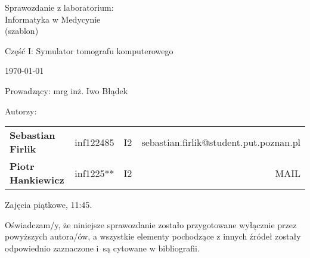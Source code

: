 \thispagestyle{empty} %

\begin{center}
{\large{Sprawozdanie z laboratorium:\\
Informatyka w Medycynie\\
(szablon)}}

\vspace{3ex}

Część I: Symulator tomografu komputerowego

\vspace{3ex}
{\footnotesize\today}

\end{center}


\vspace{10ex}

Prowadzący: mrg inż. Iwo Błądek

\vspace{5ex}

Autorzy:
\begin{tabular}{lllr}
\textbf{Sebastian Firlik} & inf122485 & I2 & sebastian.firlik@student.put.poznan.pl \\
\textbf{Piotr Hankiewicz} & inf1225** & I2 & MAIL \\
\end{tabular}

\vspace{5ex}

Zajęcia piątkowe, 11:45.

\vspace{35ex}

\noindent Oświadczam/y, że niniejsze sprawozdanie zostało przygotowane wyłącznie przez powyższych autora/ów,
a wszystkie elementy pochodzące z innych źródeł zostały odpowiednio zaznaczone i~są cytowane w bibliografii.  

\newpage

